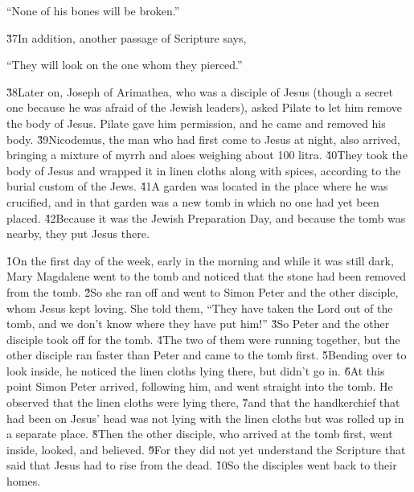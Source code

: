 \begin{poetry}
\poeml ``None of his bones will be broken.''
\end{poetry}

\v{37}In addition, another passage of Scripture says,

\begin{poetry}
\poeml ``They will look on the one whom they pierced.''
\end{poetry}

\v{38}Later on, Joseph of Arimathea, who was a disciple of Jesus (though a secret one because he was afraid of the Jewish leaders), asked Pilate to let him remove the body of Jesus. Pilate gave him permission, and he came and removed his body. \v{39}Nicodemus, the man who had first come to Jesus at night, also arrived, bringing a mixture of myrrh and aloes weighing about 100 litra. \v{40}They took the body of Jesus and wrapped it in linen cloths along with spices, according to the burial custom of the Jews. \v{41}A garden was located in the place where he was crucified, and in that garden was a new tomb in which no one had yet been placed. \v{42}Because it was the Jewish Preparation Day, and because the tomb was nearby, they put Jesus there.

\v{1}On the first day of the week, early in the morning and while it was still dark, Mary Magdalene went to the tomb and noticed that the stone had been removed from the tomb. \v{2}So she ran off and went to Simon Peter and the other disciple, whom Jesus kept loving. She told them, ``They have taken the Lord out of the tomb, and we don't know where they have put him!'' \v{3}So Peter and the other disciple took off for the tomb. \v{4}The two of them were running together, but the other disciple ran faster than Peter and came to the tomb first. \v{5}Bending over to look inside, he noticed the linen cloths lying there, but didn't go in. \v{6}At this point Simon Peter arrived, following him, and went straight into the tomb. He observed that the linen cloths were lying there, \v{7}and that the handkerchief that had been on Jesus' head was not lying with the linen cloths but was rolled up in a separate place. \v{8}Then the other disciple, who arrived at the tomb first, went inside, looked, and believed. \v{9}For they did not yet understand the Scripture that said that Jesus had to rise from the dead. \v{10}So the disciples went back to their homes.

